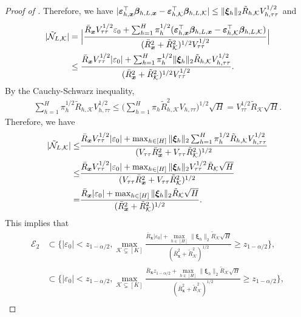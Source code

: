 \documentclass[10pt,a4paper]{amsart}
\newcommand{\Lin}{\textnormal{L}}
\newcommand{\bs}{\boldsymbol}
\newcommand{\mk}{\mathcal{K}}
\begin{document}
\begin{proof}[Proof of ]
Therefore, we have $|\bs{\varepsilon}_{ h, \bs{x}}^\top \bs{\beta}_{h, \Lin , \bs{x}}-\bs{\varepsilon}_{ h, \mk}^\top\bs{\beta}_{ h, \Lin, \mk}| \leq \|\bs{\xi}_{ h }\|_2\tilde{R}_{ h, \mk}V_{ h,\tau\tau}^{1/2}$ and
\begin{align*}
    |\tilde{\mathcal{N}}_{\Lin,\mk}| &= \Big| \frac{\bar{R}_{\bs{x}} V_{\tau\tau}^{1/2}\varepsilon_0+\sum_{h=1}^H \pi_{ h }^{1/2}(\bs{\varepsilon}_{ h, \bs{x}}^\top \bs{\beta}_{h, \Lin , \bs{x}}-\bs{\varepsilon}_{ h, \mk}^\top\bs{\beta}_{ h, \Lin, \mk})}{(\bar{R}_{\bs{x}}^2 +\tilde{R}^2_{\mk})^{1/2}V_{\tau\tau}^{1/2}} \Big|\\
    &\leq \frac{\bar{R}_{\bs{x}} V_{\tau\tau}^{1/2}|\varepsilon_0|+\sum_{h=1}^H \pi_{ h }^{1/2}\|\bs{\xi}_{ h }\|_2\tilde{R}_{ h, \mk}V_{ h,\tau\tau}^{1/2}}{(\bar{R}_{\bs{x}}^2 +\tilde{R}^2_{\mk})^{1/2}V_{\tau\tau}^{1/2}}.
\end{align*}
By the Cauchy-Schwarz inequality,
\begin{align*}
    \sum_{h=1}^H \pi_{ h }^{1/2} \tilde{R}_{ h, \mk}V_{ h,\tau\tau}^{1/2} \leq \Big(\sum_{h=1}^H \pi_{ h } \tilde{R}^2_{h,\mk} V_{ h,\tau\tau}\Big)^{1/2} \sqrt{H} = V_{\tau\tau}^{1/2}\tilde{R}_{\mk}\sqrt{H}.
\end{align*}
Therefore, we have
\begin{align*}
    |\tilde{\mathcal{N}}_{\Lin,\mk}|\leq & \frac{\bar{R}_{\bs{x}} V_{\tau\tau}^{1/2}|\varepsilon_0|+\max_{h\in [H]}\|\bs{\xi}_{ h }\|_2 \sum_{h=1}^H \pi_{ h }^{1/2}\tilde{R}_{ h, \mk}V_{ h,\tau\tau}^{1/2}}{(V_{\tau\tau}\bar{R}_{\bs{x}}^2 +V_{\tau\tau}\tilde{R}^2_{\mk})^{1/2}}\\
    \leq & \frac{\bar{R}_{\bs{x}} V_{\tau\tau}^{1/2}|\varepsilon_0|+\max_{h\in [H]}\|\bs{\xi}_{ h }\|_2 V_{\tau\tau}^{1/2}\tilde{R}_{\mk}\sqrt{H}}{(V_{\tau\tau}\bar{R}_{\bs{x}}^2 +V_{\tau\tau}\tilde{R}^2_{\mk})^{1/2}}\\
    =&  \frac{\bar{R}_{\bs{x}} |\varepsilon_0|+\max_{h\in [H]}\|\bs{\xi}_{ h }\|_2 \tilde{R}_{\mk}\sqrt{H}}{(\bar{R}_{\bs{x}}^2 +\tilde{R}^2_{\mk})^{1/2}}.
\end{align*}
This implies that
\begin{align*}
\mathcal{E}_2 & \subset \Big\{|\varepsilon_0| < z_{1-\alpha/2},\max_{\mk \subsetneq [K]}\frac{\bar{R}_{\bs{x}} |\varepsilon_0|+\max_{h\in [H]} \|\bs{\xi}_{ h }\|_2\tilde{R}_{\mk}\sqrt{H}}{(\bar{R}_{\bs{x}}^2 +\tilde{R}^2_{\mk})^{1/2}} \geq z_{1-\alpha/2}\Big\},\\
   & \subset \Big\{|\varepsilon_0| < z_{1-\alpha/2},\max_{\mk \subsetneq [K]}\frac{\bar{R}_{\bs{x}} z_{1-\alpha/2}+\max_{h\in [H]} \|\bs{\xi}_{ h }\|_2\tilde{R}_{\mk}\sqrt{H}}{(\bar{R}_{\bs{x}}^2 +\tilde{R}^2_{\mk})^{1/2}} \geq z_{1-\alpha/2}\Big\},\\

\end{align*}
\end{proof}
\end{document}

